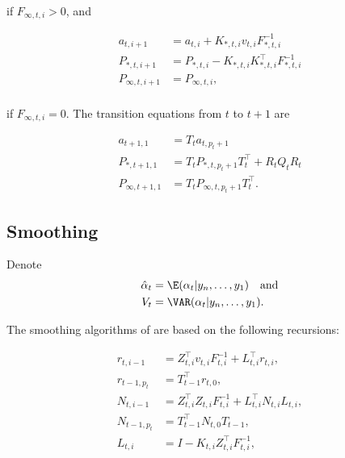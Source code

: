 \documentclass[nojss,article]{jss}\usepackage[]{graphicx}\usepackage[]{color}
\begin{document}
if $F_{\infty,t,i}>0$, and

\begin{equation*} 
\begin{aligned}
a_{t,i+1} &= a_{t,i} + K_{\ast,t,i} v_{t,i}F_{\ast,t,i}^{-1} \\
P_{\ast,t,i+1} &= P_{\ast,t,i} -K_{\ast,t,i}K^\top_{\ast,t,i}F_{\ast,t,i}^{-1}\\
P_{\infty,t,i+1} &= P_{\infty,t,i},\\
\end{aligned} 
\end{equation*}

if $F_{\infty,t,i}=0$. The transition equations from $t$ to $t+1$ are

\begin{equation*} 
\begin{aligned}
a_{t+1,1} &= T_t a_{t,p_t+1}\\
P_{\ast,t+1,1} &= T_t P_{\ast,t,p_t+1} T_t^\top + R_t Q_t R_t\\
P_{\infty,t+1,1} &= T_t P_{\infty,t,p_t+1} T_t^\top. 
\end{aligned}
\end{equation*}


\subsection{Smoothing}
Denote
\begin{equation*} 
\begin{aligned}
\hat\alpha_{t} &= \E(\alpha_{t}|y_n,\ldots,y_1) \quad \textrm{and}  \\
V_{t} &= \VAR(\alpha_{t}|y_n,\ldots,y_1).
\end{aligned} 
\end{equation*}

The smoothing algorithms of  are based on the following recursions:

\begin{equation*} 
\begin{aligned}
r_{t,i-1} &= Z_{t,i}^\top v_{t,i}F_{t,i}^{-1} + L_{t,i}^\top r_{t,i}, \\
r_{t-1,p_t} &= T_{t-1}^\top r_{t,0},\\
N_{t,i-1} &= Z_{t,i}^\top Z_{t,i}F_{t,i}^{-1} +L_{t,i}^\top N_{t,i}L_{t,i},\\
N_{t-1,p_t} &= T_{t-1}^\top N_{t,0}T_{t-1},\\
L_{t,i} &= I - K_{t,i}Z_{t,i}^\top F_{t,i}^{-1},
\end{aligned} 
\end{equation*}
\end{document}
